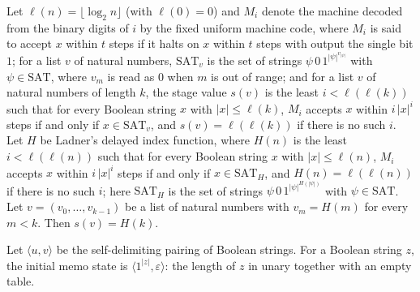 \begin{theorem}
\label{Complexity.ladner_stage_correct}
\leanok
{}
Let $\ell(n)=\lfloor\log_2 n\rfloor$ (with $\ell(0)=0$) and $M_i$ denote the machine decoded from the binary digits of $i$ by the fixed uniform machine code, where $M_i$ is said to accept $x$ within $t$ steps if it halts on $x$ within $t$ steps with output the single bit $1$; for a list $v$ of natural numbers, $\mathrm{SAT}_v$ is the set of strings $\psi\,0\,1^{|\psi|^{v_{|\psi|}}}$ with $\psi\in\mathrm{SAT}$, where $v_m$ is read as $0$ when $m$ is out of range; and for a list $v$ of natural numbers of length $k$, the stage value $s(v)$ is the least $i<\ell(\ell(k))$ such that for every Boolean string $x$ with $|x|\le\ell(k)$, $M_i$ accepts $x$ within $i\,|x|^i$ steps if and only if $x\in\mathrm{SAT}_v$, and $s(v)=\ell(\ell(k))$ if there is no such $i$. Let $H$ be Ladner's delayed index function, where $H(n)$ is the least $i<\ell(\ell(n))$ such that for every Boolean string $x$ with $|x|\le\ell(n)$, $M_i$ accepts $x$ within $i\,|x|^i$ steps if and only if $x\in\mathrm{SAT}_H$, and $H(n)=\ell(\ell(n))$ if there is no such $i$; here $\mathrm{SAT}_H$ is the set of strings $\psi\,0\,1^{|\psi|^{H(|\psi|)}}$ with $\psi\in\mathrm{SAT}$. Let $v=(v_0,\dots,v_{k-1})$ be a list of natural
numbers with $v_m=H(m)$ for every $m<k$. Then $s(v)=H(k)$.
\end{theorem}

\begin{definition}
\label{Complexity.ladner_memoInit}
\leanok
{}
Let $\langle u,v\rangle$ be the self-delimiting pairing of Boolean strings. For a Boolean string
$z$, the initial memo state is $\langle 1^{|z|},\varepsilon\rangle$: the length of $z$ in unary
together with an empty table.
\end{definition}

